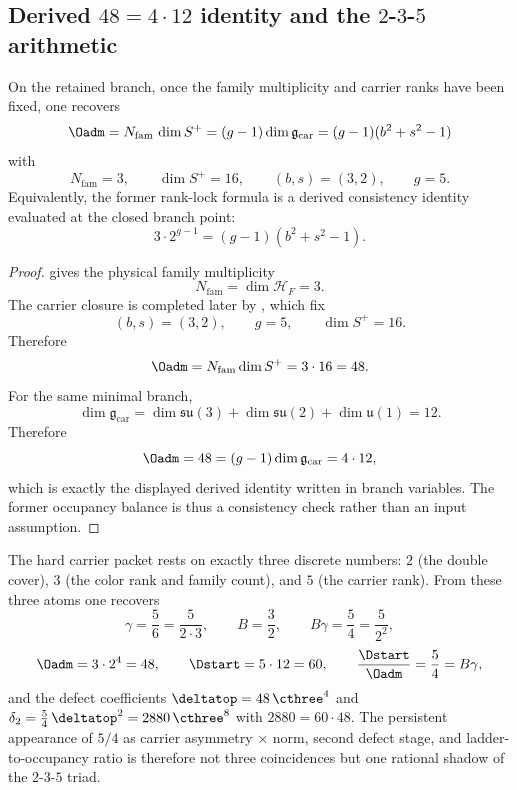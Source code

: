 \subsection{Derived \texorpdfstring{$48=4\cdot12$}{48=4·12} identity and the \texorpdfstring{$2$-$3$-$5$}{2-3-5} arithmetic}

\begin{proposition}[Derived \texorpdfstring{$48=4\cdot12$}{48=4·12} identity on the retained branch]
\label{prop:rank-lock}
On the retained branch, once the family multiplicity and carrier ranks have been fixed, one
recovers
\[
\Oadm
=
N_{\mathrm{fam}}\,\dim S^+
=
(g-1)\dim\mathfrak g_{\mathrm{car}}
=
(g-1)(b^2+s^2-1)
\]
with
\[
N_{\mathrm{fam}}=3,
\qquad
\dim S^+=16,
\qquad
(b,s)=(3,2),
\qquad
g=5.
\]
Equivalently, the former rank-lock formula is a derived consistency identity evaluated at the
closed branch point:
\begin{equation}
\label{eq:rank-lock}
3\cdot 2^{g-1}=(g-1)(b^2+s^2-1).
\end{equation}
\end{proposition}

\begin{proof}
 gives the physical family multiplicity
\[
N_{\mathrm{fam}}=\dim\mathcal H_F=3.
\]
The carrier closure is completed later by , which
fix
\[
(b,s)=(3,2),
\qquad
g=5,
\qquad
\dim S^+=16.
\]
Therefore
\[
\Oadm=N_{\mathrm{fam}}\dim S^+=3\cdot16=48.
\]
For the same minimal branch,
\[
\dim\mathfrak g_{\mathrm{car}}
=
\dim\mathfrak{su}(3)+\dim\mathfrak{su}(2)+\dim\mathfrak u(1)
=
12.
\]
Therefore
\[
\Oadm=48=(g-1)\dim\mathfrak g_{\mathrm{car}}=4\cdot 12,
\]
which is exactly the displayed derived identity written in branch variables. The former occupancy
balance is thus a consistency check rather than an input assumption.
\end{proof}

\begin{remark}
The hard carrier packet rests on exactly three discrete numbers: $2$ (the double cover), $3$ (the color rank and family count), and $5$ (the carrier rank). From these three atoms one recovers
\[
\gamma=\frac{5}{6}=\frac{5}{2\cdot 3},
\qquad
B=\frac{3}{2},
\qquad
B\gamma=\frac{5}{4}=\frac{5}{2^2},
\]
\[
\Oadm=3\cdot 2^4=48,
\qquad
\Dstart=5\cdot 12=60,
\qquad
\frac{\Dstart}{\Oadm}=\frac{5}{4}=B\gamma,
\]
and the defect coefficients $\deltatop=48\,\cthree^4$ and $\delta_2=\frac54\,\deltatop^2=2880\,\cthree^8$ with $2880=60\cdot 48$.
The persistent appearance of $5/4$ as carrier asymmetry $\times$ norm, second defect stage, and ladder-to-occupancy ratio is therefore not three coincidences but one rational shadow of the $2$-$3$-$5$ triad.
\end{remark}

